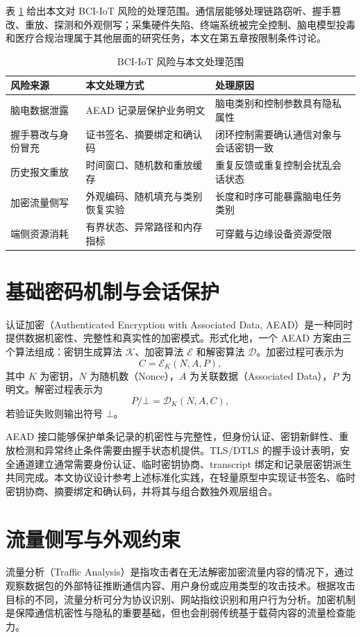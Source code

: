 表 \ref{tab:c2-risk-scope} 给出本文对 BCI-IoT 风险的处理范围。通信层能够处理链路窃听、握手篡改、重放、探测和外观侧写；采集硬件失陷、终端系统被完全控制、脑电模型投毒和医疗合规治理属于其他层面的研究任务，本文在第五章按限制条件讨论。

\begin{table}[H]
\centering
\small
\caption{BCI-IoT 风险与本文处理范围}
\label{tab:c2-risk-scope}
\begin{tabular}{p{3.2cm}p{4.7cm}p{5.1cm}}
\toprule
风险来源 & 本文处理方式 & 处理原因 \\
\midrule
脑电数据泄露 & AEAD 记录层保护业务明文 & 脑电类别和控制参数具有隐私属性 \\
握手篡改与身份冒充 & 证书签名、摘要绑定和确认码 & 闭环控制需要确认通信对象与会话密钥一致 \\
历史报文重放 & 时间窗口、随机数和重放缓存 & 重复反馈或重复控制会扰乱会话状态 \\
加密流量侧写 & 外观编码、随机填充与类别恢复实验 & 长度和时序可能暴露脑电任务类别 \\
端侧资源消耗 & 有界状态、异常路径和内存指标 & 可穿戴与边缘设备资源受限 \\
\bottomrule
\end{tabular}
\end{table}

\section{基础密码机制与会话保护}
认证加密（Authenticated Encryption with Associated Data, AEAD）是一种同时提供数据机密性、完整性和真实性的加密模式\cite{rfc5116}。形式化地，一个 AEAD 方案由三个算法组成：密钥生成算法 $\mathcal{K}$、加密算法 $\mathcal{E}$ 和解密算法 $\mathcal{D}$。加密过程可表示为
\[
C = \mathcal{E}_K(N, A, P),
\]
其中 $K$ 为密钥，$N$ 为随机数（Nonce），$A$ 为关联数据（Associated Data），$P$ 为明文。解密过程表示为
\[
P/\bot = \mathcal{D}_K(N, A, C),
\]
若验证失败则输出符号 $\bot$。

AEAD 接口能够保护单条记录的机密性与完整性，但身份认证、密钥新鲜性、重放检测和异常终止条件需要由握手状态机提供。TLS/DTLS 的握手设计表明，安全通道建立通常需要身份认证、临时密钥协商、transcript 绑定和记录层密钥派生共同完成\cite{rfc8446,rfc9147}。本文协议设计参考上述标准化实践，在轻量原型中实现证书签名、临时密钥协商、摘要绑定和确认码，并将其与组合数独外观层组合。

\section{流量侧写与外观约束}
流量分析（Traffic Analysis）是指攻击者在无法解密加密流量内容的情况下，通过观察数据包的外部特征推断通信内容、用户身份或应用类型的攻击技术\cite{alwhbi2024encrypted,hou2024encmalware}。根据攻击目标的不同，流量分析可分为协议识别、网站指纹识别和用户行为分析。加密机制是保障通信机密性与隐私的重要基础，但也会削弱传统基于载荷内容的流量检查能力\cite{fu2025encryptedtraffic,hou2024encmalware}。

